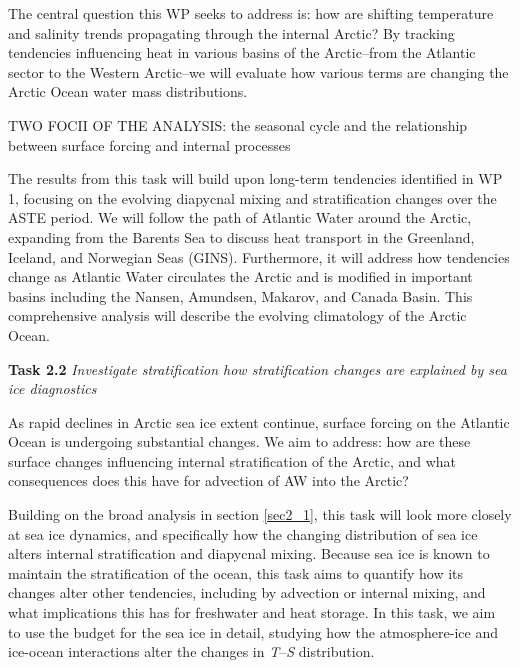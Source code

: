 \documentclass[a4paper,12pt]{article}
\begin{document}
    The central question this WP seeks to address is: how are shifting temperature and salinity trends propagating through the internal Arctic? By tracking tendencies influencing heat in various basins of the Arctic--from the Atlantic sector to the Western Arctic--we will evaluate how various terms are changing the Arctic Ocean water mass distributions.

    TWO FOCII OF THE ANALYSIS: the seasonal cycle and the relationship between surface forcing and internal processes

    The results from this task will build upon long-term tendencies identified in WP 1, focusing on the evolving diapycnal mixing and stratification changes over the ASTE period. We will follow the path of Atlantic Water around the Arctic, expanding from the Barents Sea to discuss heat transport in the Greenland, Iceland, and Norwegian Seas (GINS). Furthermore, it will address how tendencies change as Atlantic Water circulates the Arctic and is modified in important basins including the Nansen, Amundsen, Makarov, and Canada Basin. This comprehensive analysis will describe the evolving climatology of the Arctic Ocean.
    
    \begin{tcolorbox}[minipage,colback=columbiablue,arc=10pt,outer arc=10pt]
    \centering
    \textbf{Task 2.2}	\emph{Investigate stratification how stratification changes are explained by sea ice diagnostics}\label{sec2_2}
    \end{tcolorbox}
    As rapid declines in Arctic sea ice extent continue, surface forcing on the Atlantic Ocean is undergoing substantial changes. We aim to address: how are these surface changes influencing internal stratification of the Arctic, and what consequences does this have for advection of AW into the Arctic?

    Building on the broad analysis in section \ref{sec2_1}, this task will look more closely at sea ice dynamics, and specifically how the changing distribution of sea ice alters internal stratification and diapycnal mixing. Because sea ice is known to maintain the stratification of the ocean, this task aims to quantify how its changes alter other tendencies, including by advection or internal mixing, and what implications this has for freshwater and heat storage. In this task, we aim to use the budget for the sea ice in detail, studying how the atmosphere-ice and ice-ocean interactions alter the changes in \emph{T}--\emph{S} distribution.
\end{document}
